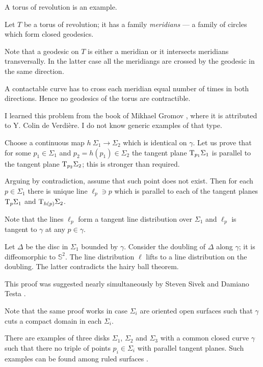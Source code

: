 A torus of revolution is an example.

\medskip

Let $T$ be a torus of revolution;
it has a family {}\emph{meridians} --- a family of circles which form closed geodesics.

Note that a geodesic on $T$ is either a meridian
or it intersects meridians transversally.
In the latter case all the meridiangs are crossed by the geodesic in the same direction.

A contactable curve has to cross each meridian equal number of times in both directions.
Hence no geodesics of the torus are contractible.\qeds 




I learned this problem 
from the book of Mikhael Gromov \cite[see][]{gromov-MetStr},
where it is attributed to Y. Colin de Verdi\`ere.
I do not know generic examples of that type.

Choose a continuous map $h\:\Sigma_1\to \Sigma_2$
which is identical on $\gamma$.
Let us prove that for some $p_1\in \Sigma_1$ and $p_2=h(p_1)\in \Sigma_2$
the tangent plane $\mathrm{T}_{p_1} \Sigma_1$ is parallel to the tangent plane $\mathrm{T}_{p_2} \Sigma_2$;
this is stronger than required.

\medskip

Arguing by contradiction,
assume that such point does not exist.
Then for each $p\in\Sigma_1$
there is unique line $\ell_p\ni p$ 
which is parallel to each of the tangent planes $\mathrm{T}_{p} \Sigma_1$ and $\mathrm{T}_{h(p)} \Sigma_2$.

Note that the lines $\ell_p$ form a tangent line distribution over $\Sigma_1$
and $\ell_p$ is tangent to $\gamma$ at any $p\in\gamma$.

Let $\Delta$ be the disc in $\Sigma_1$ bounded by $\gamma$.
Consider the doubling of $\Delta$ along  $\gamma$;
it is diffeomorphic to $\mathbb S^2$.
The line distribution $\ell$ lifts to a line distribution on the doubling.
The latter contradicts the hairy ball theorem.\qeds


This proof was suggested nearly simultaneously 
by Steven Sivek 
and Damiano Testa \cite[see][]{two-discs}.

Note that the same proof works in case $\Sigma_i$ are oriented open surfaces such that $\gamma$ cuts a compact domain in each $\Sigma_i$.

There are examples of three disks $\Sigma_1$, $\Sigma_2$ and $\Sigma_3$
with a common closed curve $\gamma$ such that there 
no triple of points $p_i\in\Sigma_i$ with parallel tangent planes.
Such examples can be found among ruled surfaces \cite[see][]{three-discs}.